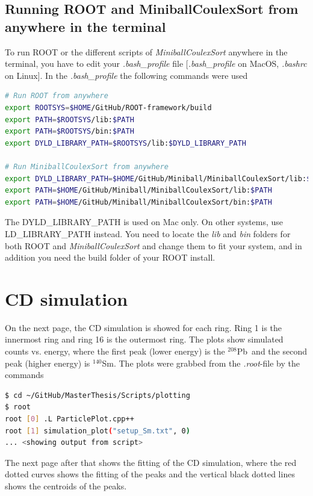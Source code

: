 \documentclass[twoside,english]{uiofysmaster/uiofysmaster}
\newcommand{\Sm}{$^{140}$Sm} %
\newcommand{\Pb}{$^{208}$Pb}
\begin{document}
\begin{appendices}
\section{Running ROOT and MiniballCoulexSort from anywhere in the terminal}
To run ROOT or the different scripts of \textsl{MiniballCoulexSort} anywhere in the terminal, you have to edit your \textit{.bash\_profile} file [\textit{.bash\_profile} on MacOS, \textit{.bashrc} on Linux]. In the \textit{.bash\_profile} the following commands were used 
\begin{lstlisting}[language=sh]
# Run ROOT from anywhere
export ROOTSYS=$HOME/GitHub/ROOT-framework/build
export PATH=$ROOTSYS/lib:$PATH
export PATH=$ROOTSYS/bin:$PATH
export DYLD_LIBRARY_PATH=$ROOTSYS/lib:$DYLD_LIBRARY_PATH

# Run MiniballCoulexSort from anywhere
export DYLD_LIBRARY_PATH=$HOME/GitHub/Miniball/MiniballCoulexSort/lib:$DYLD_LIBRARY_PATH
export PATH=$HOME/GitHub/Miniball/MiniballCoulexSort/lib:$PATH
export PATH=$HOME/GitHub/Miniball/MiniballCoulexSort/bin:$PATH
\end{lstlisting}
The DYLD\_LIBRARY\_PATH is used on Mac only. On other systems, use \newline LD\_LIBRARY\_PATH instead. You need to locate the \textit{lib} and \textit{bin} folders for both ROOT and \textsl{MiniballCoulexSort} and change them to fit your system, and in addition you need the build folder of your ROOT install.


\chapter{CD simulation}\label{ch:cd_sim}
On the next page, the CD simulation is showed for each ring. Ring 1 is the innermost ring and ring 16 is the outermost ring. The plots show simulated counts vs. energy, where the first peak (lower energy) is the \Pb\ and the second peak (higher energy) is \Sm. The plots were grabbed from the \textit{.root}-file by the commands

\begin{lstlisting}[language=sh]
$ cd ~/GitHub/MasterThesis/Scripts/plotting
$ root
root [0] .L ParticlePlot.cpp++
root [1] simulation_plot("setup_Sm.txt", 0)
... <showing output from script>
\end{lstlisting}

The next page after that shows the fitting of the CD simulation, where the red dotted curves shows the fitting of the peaks and the vertical black dotted lines shows the centroids of the peaks.


\end{appendices}
\end{document}
